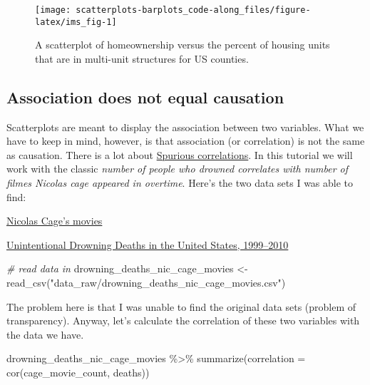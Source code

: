 \documentclass[
]{article}
\newenvironment{Shaded}{\begin{snugshade}}{\end{snugshade}}
\newcommand{\AttributeTok}[1]{\textcolor[rgb]{0.77,0.63,0.00}{#1}}
\newcommand{\CommentTok}[1]{\textcolor[rgb]{0.56,0.35,0.01}{\textit{#1}}}
\newcommand{\FunctionTok}[1]{\textcolor[rgb]{0.00,0.00,0.00}{#1}}
\newcommand{\NormalTok}[1]{#1}
\newcommand{\OtherTok}[1]{\textcolor[rgb]{0.56,0.35,0.01}{#1}}
\newcommand{\SpecialCharTok}[1]{\textcolor[rgb]{0.00,0.00,0.00}{#1}}
\newcommand{\StringTok}[1]{\textcolor[rgb]{0.31,0.60,0.02}{#1}}
\begin{document}
\begin{figure}

{\centering \texttt{[image: scatterplots-barplots\_code-along\_files/figure-latex/ims\_fig-1]} 

}

\caption{A scatterplot of homeownership versus the percent of housing units that are in multi-unit structures for US counties.}\label{fig:ims_fig}
\end{figure}

\hypertarget{association-does-not-equal-causation}{%
\subsection{Association does not equal
causation}\label{association-does-not-equal-causation}}

Scatterplots are meant to display the association between two variables.
What we have to keep in mind, however, is that association (or
correlation) is not the same as causation. There is a lot about
\href{http://tylervigen.com/spurious-correlations}{Spurious
correlations}. In this tutorial we will work with the classic
\emph{number of people who drowned correlates with number of filmes
Nicolas cage appeared in overtime}. Here's the two data sets I was able
to find:

\href{https://www.kaggle.com/eharlett/nic-cage-movies}{Nicolas Cage's
movies}

\href{https://www.cdc.gov/nchs/data/databriefs/db149_table.pdf\#1}{Unintentional
Drowning Deaths in the United States, 1999--2010}

\begin{Shaded}
\begin{Highlighting}[]
\CommentTok{\# read data in}
\NormalTok{drowning\_deaths\_nic\_cage\_movies }\OtherTok{\textless{}{-}} \FunctionTok{read\_csv}\NormalTok{(}\StringTok{"data\_raw/drowning\_deaths\_nic\_cage\_movies.csv"}\NormalTok{)}
\end{Highlighting}
\end{Shaded}

The problem here is that I was unable to find the original data sets
(problem of transparency). Anyway, let's calculate the correlation of
these two variables with the data we have.

\begin{Shaded}
\begin{Highlighting}[]
\NormalTok{drowning\_deaths\_nic\_cage\_movies }\SpecialCharTok{\%\textgreater{}\%}
  \FunctionTok{summarize}\NormalTok{(}\AttributeTok{correlation =} \FunctionTok{cor}\NormalTok{(cage\_movie\_count, deaths))}
\end{Highlighting}
\end{Shaded}
\end{document}
